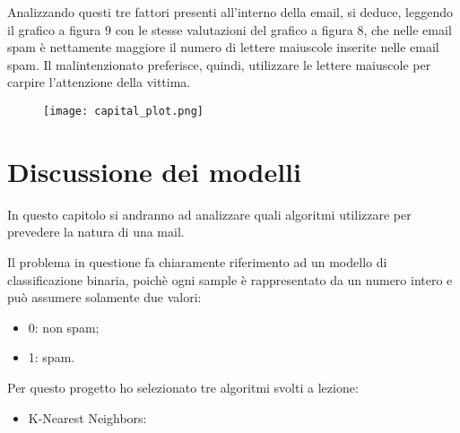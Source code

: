 \documentclass[12pt,a4paper]{article}
\begin{document}
Analizzando questi tre fattori presenti all'interno della email, si deduce, leggendo il grafico a figura 9 con le stesse valutazioni del grafico a figura 8, che nelle email spam è nettamente maggiore il numero di lettere maiuscole inserite nelle email spam.
Il malintenzionato preferisce, quindi, utilizzare le lettere maiuscole per carpire l'attenzione della vittima.

\begin{figure}[h]
    \centering
    \texttt{[image: capital\_plot.png]}
    \caption{}
\end{figure}
\section{Discussione dei modelli}
In questo capitolo si andranno ad analizzare quali algoritmi utilizzare per prevedere la  natura di una mail.

Il problema in questione fa chiaramente riferimento ad un modello di classificazione binaria, poichè ogni sample è rappresentato da un numero intero e può assumere solamente due valori:
\begin{itemize}
    \item 0: non spam;
    \item 1: spam.
\end{itemize}
Per questo progetto ho selezionato tre algoritmi svolti a lezione:
\begin{itemize}
    \item K-Nearest Neighbors:
\end{itemize}
\end{document}
